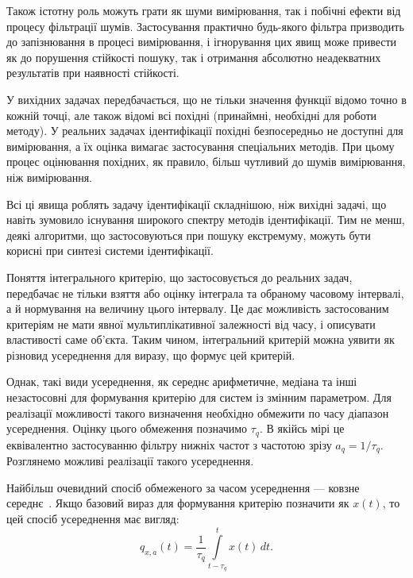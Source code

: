 Також істотну роль можуть грати як шуми вимірювання, так і
побічні ефекти від процесу фільтрації шумів. Застосування
практично будь-якого фільтра призводить до запізнювання в
процесі вимірювання, і ігнорування цих явищ може привести
як до порушення стійкості пошуку, так і отримання абсолютно
неадекватних результатів при наявності стійкості.

У вихідних задачах передбачається, що не тільки значення
функції відомо точно в кожній точці, але також відомі всі
похідні (принаймні, необхідні для роботи методу). У реальних
задачах ідентифікації похідні безпосередньо не доступні для
вимірювання, а їх оцінка вимагає застосування спеціальних
методів. При цьому процес оцінювання похідних, як правило,
більш чутливий до шумів вимірювання, ніж вимірювання.




Всі ці явища роблять задачу ідентифікації складнішою, ніж
вихідні задачі, що навіть зумовило існування широкого
спектру методів ідентифікації. Тим не менш, деякі алгоритми,
що застосовуються при пошуку екстремуму, можуть бути корисні
при синтезі системи ідентифікації.


Поняття інтегрального критерію, що застосовується до реальних задач, передбачає
не тільки взяття або оцінку інтеграла та обраному часовому
інтервалі, а й нормування на величину цього інтервалу. Це дає можливість
застосованим критеріям не мати явної мультиплікативної залежності від часу, і
описувати властивості саме об'єкта. Таким чином, інтегральний критерій можна
уявити як різновид усереднення для виразу, що формує цей критерій.

Однак, такі види усереднення, як середнє арифметичне, медіана та
інші незастосовні для формування критерію для систем із змінним
параметром. Для реалізації можливості такого визначення
необхідно обмежити по часу діапазон усереднення. Оцінку
цього обмеження позначимо
\label{atu:d:tau_q}$\tau_q$.
В якійсь мірі це еквівалентно застосуванню фільтру нижніх
частот з частотою зрізу
\label{atu:d:a_q}$a_q = 1 / \tau_q$.
Розглянемо можливі реалізації такого усереднення.

Найбільш очевидний спосіб обмеженого за часом усереднення ---
ковзне середнє~\cite{greshilov_mat_met_prognoz}.
Якщо базовий вираз для формування критерію позначити як
$x(t)$, то цей спосіб усереднення має вигляд:
%
\begin{equation}
  q_{x,a}(t) =
  \frac{1}{\tau_q}
  \int\limits_{t-\tau_q}^{t} x(t) \, dt.
  \label{atu:eq:moving_avarage}
\end{equation}


